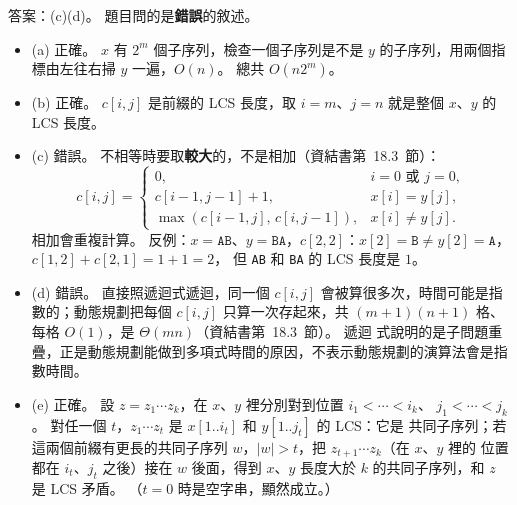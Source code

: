 \begin{pastsoln}
答案：(c)(d)。 題目問的是\textbf{錯誤}的敘述。

\begin{itemize}
\item (a) 正確。 $x$ 有 $2^m$ 個子序列，檢查一個子序列是不是 $y$ 的子序列，用兩個指標由左往右掃
$y$ 一遍，$O(n)$。 總共 $O(n 2^m)$。
\item (b) 正確。 $c[i, j]$ 是前綴的 LCS 長度，取 $i = m$、$j = n$ 就是整個 $x$、$y$ 的 LCS 長度。
\item (c) 錯誤。 不相等時要取\textbf{較大}的，不是相加（資結書第~18.3~節）：
\[
c[i, j] = \begin{cases}
0, & i = 0 \text{ 或 } j = 0,\\
c[i-1, j-1] + 1, & x[i] = y[j],\\
\max(c[i-1, j],\, c[i, j-1]), & x[i] \ne y[j].
\end{cases}
\]
相加會重複計算。 反例：$x = \texttt{AB}$、$y = \texttt{BA}$，$c[2, 2]$：$x[2] = \texttt{B} \ne y[2] = \texttt{A}$，$c[1, 2] + c[2, 1] = 1 + 1 = 2$，
但 \texttt{AB} 和 \texttt{BA} 的 LCS 長度是 $1$。
\item (d) 錯誤。 直接照遞迴式遞迴，同一個 $c[i, j]$ 會被算很多次，時間可能是指數的；動態規劃把每個
$c[i, j]$ 只算一次存起來，共 $(m+1)(n+1)$ 格、每格 $O(1)$，是 $\Theta(mn)$（資結書第~18.3~節）。 遞迴
式說明的是子問題重疊，正是動態規劃能做到多項式時間的原因，不表示動態規劃的演算法會是指數時間。
\item (e) 正確。 設 $z = z_1 \cdots z_k$，在 $x$、$y$ 裡分別對到位置 $i_1 < \cdots < i_k$、
$j_1 < \cdots < j_k$。 對任一個 $t$，$z_1 \cdots z_t$ 是 $x[1..i_t]$ 和 $y[1..j_t]$ 的 LCS：它是
共同子序列；若這兩個前綴有更長的共同子序列 $w$，$|w| > t$，把 $z_{t+1} \cdots z_k$（在 $x$、$y$ 裡的
位置都在 $i_t$、$j_t$ 之後）接在 $w$ 後面，得到 $x$、$y$ 長度大於 $k$ 的共同子序列，和 $z$ 是 LCS
矛盾。 （$t = 0$ 時是空字串，顯然成立。）
\end{itemize}
\end{pastsoln}
